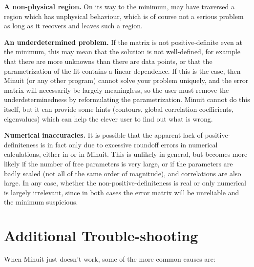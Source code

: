 \begin{UL}
\item {\bf A non-physical region.}
      On its way to the minimum, 
      may have traversed a region which has
      unphysical behaviour, which is of course not a serious problem as long
      as it recovers and leaves such a region.
\item {\bf An underdetermined problem.}
      If the matrix is not positive-definite even at the minimum,
      this may mean that the solution is not well-defined, for example
      that there are more unknowns than there are data points, or that the
      parametrization of the fit contains a linear dependence.
      If this is the case, then Minuit (or any other program) cannot solve
      your problem uniquely, and the error matrix will necessarily be
      largely meaningless, so the user must remove the underdeterminedness
      by reformulating the parametrization. Minuit cannot do this itself,
      but it can provide some hints (contours, global correlation coefficients,
      eigenvalues) which can help the clever user to find out what is wrong.
\item {\bf Numerical inaccuracies.}
      It is possible that the apparent lack of positive-definiteness
      is in fact only due to excessive roundoff errors in numerical
      calculations, either in  or in Minuit.
      This is unlikely in general, but becomes more likely if the number of
      free parameters is very large, or if the parameters are badly scaled
      (not all of the same order of magnitude), and correlations are
      also large.
      In any  case, whether the non-positive-definiteness is
      real or only numerical is largely irrelevant, since in both cases the
      error matrix will be unreliable and the minimum suspicious.
\end{UL}

\section{Additional Trouble-shooting}

When Minuit just doesn't work, some of the more common causes are:

